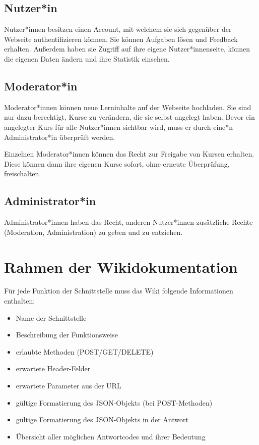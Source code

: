 \documentclass[accentcolor=tud0b,12pt,paper=a4]{tudreport}
\begin{document}
\subsection{Nutzer*in}
Nutzer*innen besitzen einen Account, mit welchem sie sich gegenüber der Webseite authentifizieren können. Sie können Aufgaben lösen und Feedback erhalten. Außerdem haben sie Zugriff auf ihre eigene Nutzer*innenseite, können die eigenen Daten ändern und ihre Statistik einsehen.

\subsection{Moderator*in}
Moderator*innen können neue Lerninhalte auf der Webseite hochladen. Sie sind nur dazu berechtigt, Kurse zu verändern, die sie selbst angelegt haben. Bevor ein angelegter Kurs für alle Nutzer*innen sichtbar wird, muss er durch eine*n Administrator*in überprüft werden.

Einzelnen Moderator*innen können das Recht zur Freigabe von Kursen erhalten. Diese können dann ihre eigenen Kurse sofort, ohne erneute Überprüfung, freischalten.

\subsection{Administrator*in}
Administrator*innen haben das Recht, anderen Nutzer*innen zusätzliche Rechte (Moderation, Administration) zu geben und zu entziehen.

\section{Rahmen der Wikidokumentation}
Für jede Funktion der Schnittstelle muss das Wiki folgende Informationen enthalten:
\begin{multicols}{2}
\begin{itemize}
	\item Name der Schnittstelle
	\item Beschreibung der Funktionsweise
	\item erlaubte Methoden (POST/GET/DELETE)
	\item erwartete Header-Felder
	\item erwartete Parameter aus der URL
	\item gültige Formatierung des JSON-Objekts (bei POST-Methoden)
	\item gültige Formatierung des JSON-Objekts in der Antwort
	\item Übersicht aller möglichen Antwortcodes und ihrer Bedeutung
\end{itemize}
\end{multicols}
\pagebreak
\end{document}
